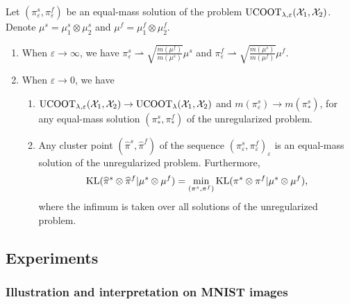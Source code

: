 \begin{proposition}
  \label{prop:convergence_minimiser_unbalanced}
  Let $(\pi_{\varepsilon}^s, \pi_{\varepsilon}^f)$ be an equal-mass solution of the problem
  $\text{UCOOT}_{\lambda, \varepsilon}(\mathcal X_1, \mathcal X_2)$. Denote $\mu^s = \mu_1^s \otimes \mu_2^s$
  and $\mu^f = \mu_1^f \otimes \mu_2^f$.
  \begin{enumerate}
    \item When $\varepsilon \to \infty$, we have $\pi_{\varepsilon}^s \rightharpoonup
    \sqrt{\frac{m(\mu^f)}{m(\mu^s)}} \mu^s$
    and $\pi_{\varepsilon}^f \rightharpoonup \sqrt{\frac{m(\mu^s)}{m(\mu^f)}} \mu^f$.

    \item When $\varepsilon \to 0$, we have
    \begin{enumerate}
      \item $\text{UCOOT}_{\lambda, \varepsilon}(\mathcal X_1, \mathcal X_2) \to \text{UCOOT}_{\lambda}(\mathcal X_1, \mathcal X_2)$ and
      $m(\pi_{\varepsilon}^s) \to m(\pi_*^s)$, for any equal-mass solution
      $(\pi_*^s, \pi_*^f)$ of the unregularized problem.

      \item Any cluster point $(\widehat{\pi}^s, \widehat{\pi}^f)$ of the sequence
      $(\pi_{\varepsilon}^s, \pi_{\varepsilon}^f)_{\varepsilon}$ is an equal-mass
      solution of the unregularized problem. Furthermore,
      \begin{equation}
        \text{KL}(\widehat{\pi}^s \otimes \widehat{\pi}^f | \mu^s \otimes \mu^f) =
        \min_{(\pi^s, \pi^f)} \text{KL}(\pi^s \otimes \pi^f \vert \mu^s \otimes \mu^f),
      \end{equation}
      where the infimum is taken over all solutions of the unregularized problem.
    \end{enumerate}
  \end{enumerate}
\end{proposition}

\subsection{Experiments} \label{sec:experiments}
\subsubsection{Illustration and interpretation on MNIST images}

